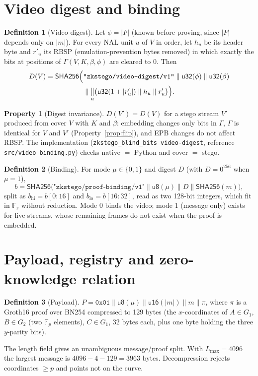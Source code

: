 \documentclass[11pt,a4paper]{article}
\theoremstyle{definition}
\newtheorem{definition}{Definition}
\newtheorem{property}{Property}
\theoremstyle{remark}
\newcommand{\SHA}{\mathsf{SHA256}}
\newcommand{\cat}{\parallel}
\begin{document}
\section{Video digest and binding}\label{sec:binding}
\begin{definition}[Video digest]
Let $\phi=|F|$ (known before proving, since $|P|$ depends only on $|m|$). For
every NAL unit $u$ of $V$ in order, let $h_u$ be its header byte and $r'_u$ its
RBSP (emulation-prevention bytes removed) in which exactly the bits at
positions of $\Gamma(V,K,\beta,\phi)$ are cleared to $0$. Then
\begin{align*}
D(V)=\SHA\Bigl(&\texttt{"zkstego/video-digest/v1"}\cat\mathsf{u32}(\phi)\cat
\mathsf{u32}(\beta)\\
&\cat\mathop{\big\Vert}_{u}\bigl(\mathsf{u32}(1+|r'_u|)\cat h_u\cat r'_u\bigr)\Bigr).
\end{align*}
\end{definition}

\begin{property}[Digest invariance]\label{prop:digest}
$D(V')=D(V)$ for a stego stream $V'$ produced from cover $V$ with $K$ and
$\beta$: embedding changes only bits in $\Gamma$, $\Gamma$ is identical for $V$
and $V'$ (Property~\ref{prop:flip}), and EPB changes do not affect RBSP. The
implementation (\texttt{zkstego\_blind\_bits video-digest}, reference
\texttt{src/video\_binding.py}) checks native $=$ Python and cover $=$ stego.
\end{property}

\begin{definition}[Binding]
For mode $\mu\in\{0,1\}$ and digest $D$ (with $D=0^{256}$ when $\mu=1$),
\[
b=\SHA\bigl(\texttt{"zkstego/proof-binding/v1"}\cat\mathsf{u8}(\mu)\cat D\cat
\SHA(m)\bigr),
\]
split as $b_{\mathrm{hi}}=b[0{:}16]$ and $b_{\mathrm{lo}}=b[16{:}32]$, read as two 128-bit integers, which fit in $\mathbb{F}_r$ without reduction.
Mode $0$ binds the video; mode $1$ (message only) exists for live streams,
whose remaining frames do not exist when the proof is embedded.
\end{definition}

\section{Payload, registry and zero-knowledge relation}
\begin{definition}[Payload]
$P=\texttt{0x01}\cat\mathsf{u8}(\mu)\cat\mathsf{u16}(|m|)\cat m\cat\pi$, where
$\pi$ is a Groth16 proof over BN254 compressed to 129 bytes (the
$x$-coordinates of $A\in G_1$, $B\in G_2$ (two $\mathbb{F}_p$ elements),
$C\in G_1$, 32 bytes each, plus one byte holding the three $y$-parity bits).
\end{definition}
The length field gives an unambiguous message/proof split. With
$L_{\max}=4096$ the largest message is $4096-4-129=3963$ bytes. Decompression
rejects coordinates $\ge p$ and points not on the curve.
\end{document}
